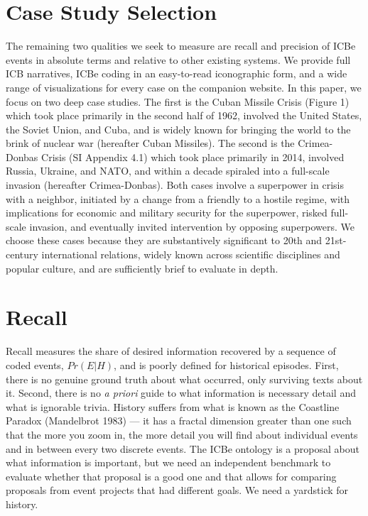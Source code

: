 \documentclass{article}
\begin{document}
\hypertarget{case-study-selection}{%
\section{Case Study Selection}\label{case-study-selection}}

The remaining two qualities we seek to measure are recall and precision
of ICBe events in absolute terms and relative to other existing systems.
We provide full ICB narratives, ICBe coding in an easy-to-read
iconographic form, and a wide range of visualizations for every case on
the companion website. In this paper, we focus on two deep case studies.
The first is the Cuban Missile Crisis (Figure 1) which took place
primarily in the second half of 1962, involved the United States, the
Soviet Union, and Cuba, and is widely known for bringing the world to
the brink of nuclear war (hereafter Cuban Missiles). The second is the
Crimea-Donbas Crisis (SI Appendix 4.1) which took place primarily in
2014, involved Russia, Ukraine, and NATO, and within a decade spiraled
into a full-scale invasion (hereafter Crimea-Donbas). Both cases involve
a superpower in crisis with a neighbor, initiated by a change from a
friendly to a hostile regime, with implications for economic and
military security for the superpower, risked full-scale invasion, and
eventually invited intervention by opposing superpowers. We choose these
cases because they are substantively significant to 20th and
21st-century international relations, widely known across scientific
disciplines and popular culture, and are sufficiently brief to evaluate
in depth.

\hypertarget{recall}{%
\section{Recall}\label{recall}}

Recall measures the share of desired information recovered by a sequence
of coded events, \(Pr(E|H)\), and is poorly defined for historical
episodes. First, there is no genuine ground truth about what occurred,
only surviving texts about it. Second, there is no \textit{a priori}
guide to what information is necessary detail and what is ignorable
trivia. History suffers from what is known as the Coastline Paradox
(Mandelbrot 1983) --- it has a fractal dimension greater than one such
that the more you zoom in, the more detail you will find about
individual events and in between every two discrete events. The ICBe
ontology is a proposal about what information is important, but we need
an independent benchmark to evaluate whether that proposal is a good one
and that allows for comparing proposals from event projects that had
different goals. We need a yardstick for history.
\end{document}
